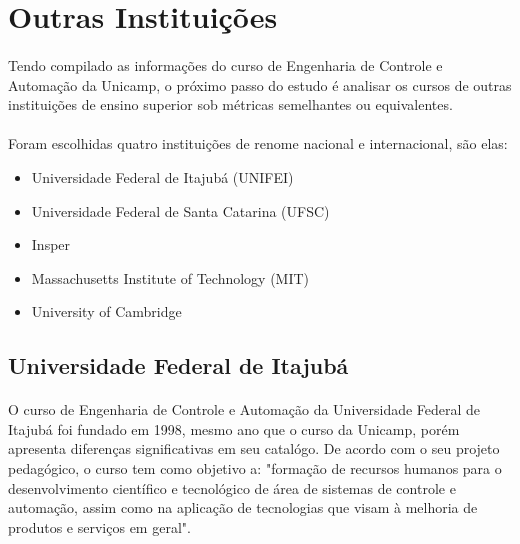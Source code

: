 \documentclass[12pt]{article} %
\begin{document}

\section{Outras Instituições}

\paragraph{} Tendo compilado as informações do curso de Engenharia de Controle e Automação da Unicamp, o próximo passo do estudo é analisar os cursos de outras instituições de ensino superior sob métricas semelhantes ou equivalentes. 

\paragraph{} Foram escolhidas quatro instituições de renome nacional e internacional, são elas:

\begin{itemize}
\item Universidade Federal de Itajubá (UNIFEI)
\item Universidade Federal de Santa Catarina (UFSC)
\item Insper
\item Massachusetts Institute of Technology (MIT)
\item University of Cambridge
\end{itemize}

\subsection{Universidade Federal de Itajubá}

\paragraph{} O curso de Engenharia de Controle e Automação da Universidade Federal de Itajubá foi fundado em 1998, mesmo ano que o curso da Unicamp, porém apresenta diferenças significativas em seu catalógo. De acordo com o seu projeto pedagógico, o curso tem como objetivo a: "formação de recursos humanos para o desenvolvimento científico e tecnológico de área de sistemas de controle e automação, assim como na aplicação de tecnologias que visam à melhoria de produtos e serviços em geral". 
\end{document}
